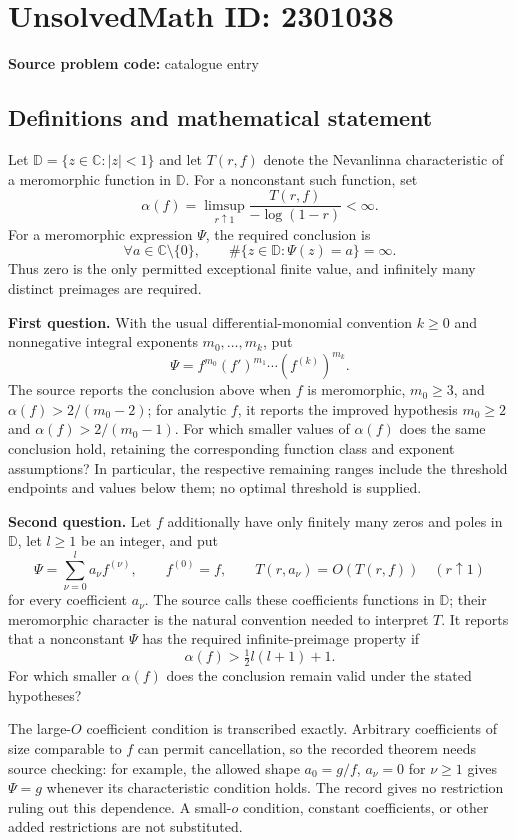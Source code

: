 \documentclass[11pt]{article}
\newcommand{\C}{\mathbb{C}}
\begin{document}
\section*{UnsolvedMath ID: 2301038}
\textbf{Source problem code:} catalogue entry
\subsection{Definitions and mathematical statement}
Let $\mathbb D=\{z\in\C:|z|<1\}$ and let $T(r,f)$ denote the Nevanlinna characteristic of a meromorphic function in $\mathbb D$. For a nonconstant such function, set
\[
 \alpha(f)=\limsup_{r\uparrow1}\frac{T(r,f)}{-\log(1-r)}<\infty.
\]
For a meromorphic expression $\Psi$, the required conclusion is
\[
 \forall a\in\C\setminus\{0\},\qquad
 \#\{z\in\mathbb D:\Psi(z)=a\}=\infty.
\]
Thus zero is the only permitted exceptional finite value, and infinitely many distinct preimages are required.

\textbf{First question.} With the usual differential-monomial convention $k\geq0$ and nonnegative integral exponents $m_0,\ldots,m_k$, put
\[
 \Psi=f^{m_0}(f')^{m_1}\cdots(f^{(k)})^{m_k}.
\]
The source reports the conclusion above when $f$ is meromorphic, $m_0\geq3$, and $\alpha(f)>2/(m_0-2)$; for analytic $f$, it reports the improved hypothesis $m_0\geq2$ and $\alpha(f)>2/(m_0-1)$. For which smaller values of $\alpha(f)$ does the same conclusion hold, retaining the corresponding function class and exponent assumptions? In particular, the respective remaining ranges include the threshold endpoints and values below them; no optimal threshold is supplied.

\textbf{Second question.} Let $f$ additionally have only finitely many zeros and poles in $\mathbb D$, let $l\geq1$ be an integer, and put
\[
 \Psi=\sum_{\nu=0}^{l}a_\nu f^{(\nu)},\qquad f^{(0)}=f,
 \qquad T(r,a_\nu)=O(T(r,f))\quad(r\uparrow1)
\]
for every coefficient $a_\nu$. The source calls these coefficients functions in $\mathbb D$; their meromorphic character is the natural convention needed to interpret $T$. It reports that a nonconstant $\Psi$ has the required infinite-preimage property if
\[
 \alpha(f)>\tfrac12l(l+1)+1.
\]
For which smaller $\alpha(f)$ does the conclusion remain valid under the stated hypotheses?

The large-$O$ coefficient condition is transcribed exactly. Arbitrary coefficients of size comparable to $f$ can permit cancellation, so the recorded theorem needs source checking: for example, the allowed shape $a_0=g/f$, $a_\nu=0$ for $\nu\geq1$ gives $\Psi=g$ whenever its characteristic condition holds. The record gives no restriction ruling out this dependence. A small-$o$ condition, constant coefficients, or other added restrictions are not substituted.
\end{document}
